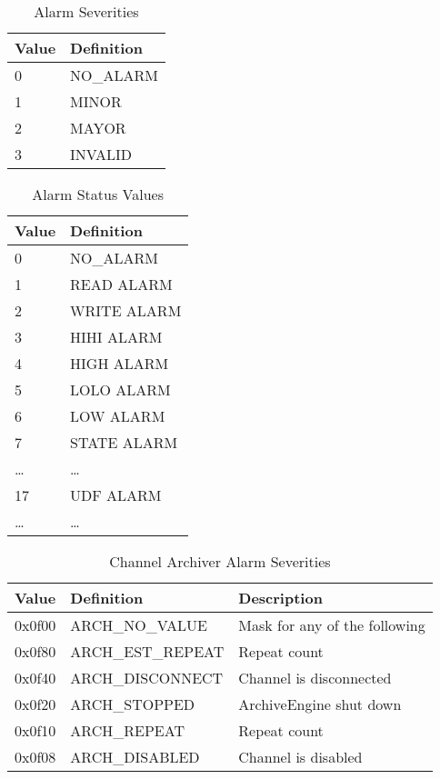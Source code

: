 \begin{table}[htbp]
  \begin{center}
    \sffamily
    \begin{tabular}[t]{l|l}
    Value & Definition \\
    \hline
      0   & NO\_ALARM   \\
      1   & MINOR      \\
      2   & MAYOR      \\
      3   & INVALID
    \end{tabular}
    \caption{Alarm Severities}
    \label{tab:sevr}
  \end{center}
\end{table}

\begin{table}[htbp]
  \begin{center}
    \sffamily
    \begin{tabular}[t]{l|l}
    Value & Definition \\
    \hline
      0   & NO\_ALARM   \\
      1   & READ ALARM   \\
      2   & WRITE ALARM \\
      3   & HIHI ALARM  \\
      4   & HIGH ALARM  \\
      5   & LOLO ALARM  \\
      6   & LOW ALARM  \\
      7   & STATE ALARM  \\
      \ldots   & \ldots  \\
      17   & UDF ALARM  \\
      \ldots   & \ldots  \\
    \end{tabular}
    \caption{Alarm Status Values}
    \label{tab:stat}
  \end{center}
\end{table}

\begin{table}[htbp]
  \begin{center}
    \sffamily
    \begin{tabular}[t]{l|l|l}
    Value & Definition                 & Description \\
    \hline
    0x0f00 & ARCH\_NO\_VALUE           & Mask for any of the following \\
    0x0f80 & ARCH\_EST\_REPEAT         & Repeat count \\
    0x0f40 & ARCH\_DISCONNECT          & Channel is disconnected \\
    0x0f20 & ARCH\_STOPPED             & ArchiveEngine shut down \\
    0x0f10 & ARCH\_REPEAT              & Repeat count \\
    0x0f08 & ARCH\_DISABLED            & Channel is disabled \\
    \end{tabular}
    \caption{Channel Archiver Alarm Severities}
    \label{tab:archsevr}
  \end{center}
\end{table}
